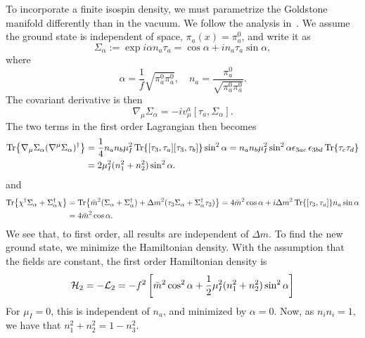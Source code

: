 To incorporate a finite isospin density, we must parametrize the Goldstone manifold differently than in the vacuum.
We follow the analysis in~\cite{Andersen:two-flavor-chpt}.
We assume the ground state is independent of space, $\pi_a(x) = \pi_a^0$, and write it as
\begin{equation}
    \Sigma_\alpha 
    :=
    \exp{i \alpha n_a \tau_a}
    = 
    \cos \alpha + i n_a \tau_a \sin \alpha,
\end{equation}
%
where
\begin{equation}
    \alpha = \frac{1}{f} \sqrt{\pi^0_a \pi^0_a}, \quad
    n_a = \frac{\pi^0_a}{\sqrt{\pi^0_a \pi^0_a}}.
\end{equation}
%
The covariant derivative is then
\begin{equation}
    \nabla_\mu \Sigma_\alpha = - iv^a_\mu [\tau_a, \Sigma_\alpha].
\end{equation}
%
The two terms in the first order Lagrangian then becomes
\begin{align}
    \nonumber
    \Tr{\nabla_\mu \Sigma_\alpha  (\nabla^\mu \Sigma_\alpha)^\dagger}
    & = 
    \frac{1}{4} n_a n_b \mu_I^2 \Tr{[\tau_3, \tau_a] [\tau_3, \tau_b]} \sin^2 \alpha
    = 
    n_a n_b \mu_I^2 \sin^2 \alpha \epsilon_{3ac} \, \epsilon_{3bd} \Tr{\tau_c \tau_d}\\
    & = 2 \mu_I^2 (n_1^2 + n_2^2) \sin^2 \alpha.
\end{align}
%
and
\begin{align}
    \nonumber
    \Tr{\chi^\dagger \Sigma_\alpha + \Sigma_\alpha^\dagger \chi}
    & = 
    \Tr{
        \bar m^2 (\Sigma_\alpha + \Sigma_\alpha^\dagger)
        + 
        \Delta m^2 (\tau_3 \Sigma_\alpha+ \Sigma_\alpha^\dagger \tau_3)
    }
    = 4 \bar m^2 \cos \alpha
    + i \Delta m^2 \Tr{[\tau_3, \tau_a]} n_a \sin \alpha \\
    & = 4 \bar m^2 \cos \alpha.
\end{align}
%
We see that, to first order, all results are independent of $\Delta m$.
To find the new ground state, we minimize the Hamiltonian density.
With the assumption that the fields are constant, the first order Hamiltonian density is
\begin{equation}
    \mathcal{H}_2 = - \mathcal{L}_2 = 
    - f^2 
    \left[
        \bar m^2 \cos^2 \alpha 
        + \frac{1}{2} \mu_I^2 (n_1^2 + n_2^2 ) \sin^2 \alpha
    \right]
\end{equation}
%
For $\mu_I = 0$, this is independent of $n_a$, and minimized by $\alpha = 0$.
Now, as $n_i n_i = 1$, we have that $n_1^2 + n_2^2 = 1 - n_3^2$.
